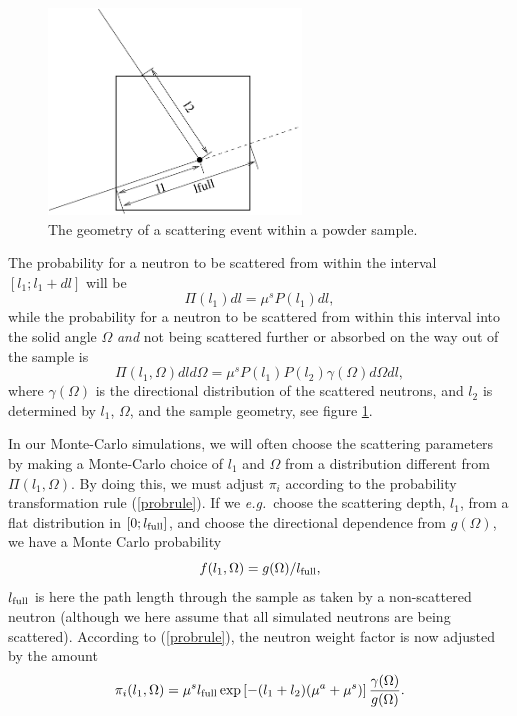 \begin{figure}
  \begin{center}
    \includegraphics[width=0.6\textwidth]{figures/scatter}
  \end{center}
\caption{The geometry of a scattering event within a powder sample.}
\label{powderFig}
\end{figure}

The probability for a neutron to be scattered from within the interval
$[ l_1 ; l_1+dl ]$ will be
\begin{equation}
\Pi(l_1) dl = \mu^s P(l_1) dl ,
\end{equation}
while the probability for a neutron to be scattered from within
this interval into the solid angle $\Omega$ {\em and}
not being scattered further
or absorbed on the way out of the sample is
\begin{equation}
\Pi(l_1,\Omega) dl d\Omega =
  \mu^s P(l_1) P(l_2) \gamma(\Omega) d\Omega dl ,
\end{equation}
where $\gamma(\Omega)$ is the directional distribution
of the scattered neutrons, and $l_2$ is determined by $l_1$,
$\Omega$, and the sample geometry, see figure \ref{powderFig}.

In our Monte-Carlo simulations, we will often choose the scattering
parameters by making a Monte-Carlo choice of $l_1$ and $\Omega$
from a distribution different from $\Pi(l_1,\Omega)$.
By doing this, we must adjust $\pi_i$ according to
the probability transformation rule (\ref{probrule}).
If we {\em e.g.}\ choose the scattering depth, $l_1$,
from a flat distribution in $[ 0 ; l_{\rm full} ]$,
and choose the directional dependence from $g(\Omega)$,
we have a Monte Carlo probability
\begin{equation}
f(l_1,\Omega) = g(\Omega) / l_{\rm full} ,
\end{equation}
$l_{\rm full}$ is here the path length through the sample
as taken by a non-scattered neutron (although we here
assume that all simulated neutrons are being scattered).
According to (\ref{probrule}), the neutron weight factor
is now adjusted by the amount
\begin{equation}     \label{sampleprob}
\pi_i(l_1,\Omega) =
 \mu^s l_{\rm full} \exp \left[ - (l_1+l_2) (\mu^a + \mu^s) \right]
  \frac{\gamma(\Omega)}{g(\Omega)} .
\end{equation}

